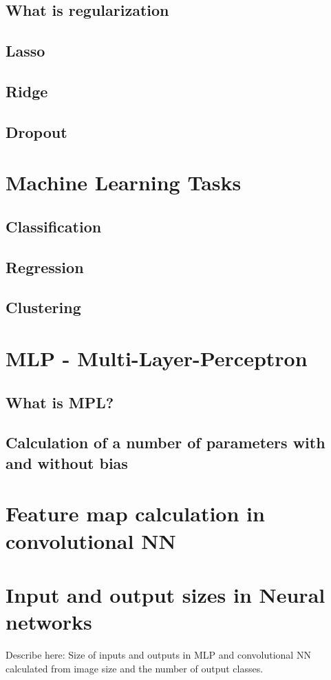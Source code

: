 \subsection{What is regularization}
\subsection{Lasso}
\subsection{Ridge}
\subsection{Dropout}

\section{Machine Learning Tasks}

\subsection{Classification}
\subsection{Regression}
\subsection{Clustering}

\section{MLP - Multi-Layer-Perceptron}
\subsection{What is MPL?}
\subsection{Calculation of a number of parameters with and without bias}

\section{Feature map calculation in convolutional NN}

\section{Input and output sizes in Neural networks}
Describe here: Size of inputs and outputs in MLP and convolutional NN calculated from image size and the number of output classes.

